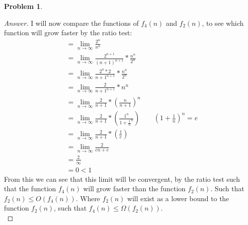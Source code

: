 \documentclass[11pt]{article}
\theoremstyle{definition}
\theoremstyle{definition}
\newtheorem{required}{Problem}
\theoremstyle{definition}
\begin{document}
\begin{required}
\begin{enumerate}[label=(\alph*)]
\begin{proof}[Answer]
I will now compare the functions of $f_4(n)$ and $f_2(n)$, to see which function will grow faster by the ratio test: \\
\begin{align*}
&= \lim_{n \to \infty} \frac{2^{n}}{n^{n}} \\
&= \lim_{n \to \infty} \frac{2^{n+1}}{(n+1)^{n+1}} * \frac{n^{n}}{2^{n}} \\
&= \lim_{n \to \infty} \frac{2^{n} * 2}{n+1^{n+1}} * \frac{n^{n}}{2^{n}} \\
&= \lim_{n \to \infty} \frac{2}{n+1^{n+1}} * n^{n} \\
&= \lim_{n \to \infty} \frac{2}{n+1} * (\frac{n}{n+1})^{n} \\
&= \lim_{n \to \infty} \frac{2}{n+1} * (\frac{1^{n}}{1+\frac{1}{n}^{n}}) \qquad (1+\frac{1}{n})^{n} = e \\
&= \lim_{n \to \infty} \frac{2}{n+1} * (\frac{1}{e}) \\
&= \lim_{n \to \infty} \frac{2}{en+e} \\
&= \frac{2}{\infty} \\
&= 0 < 1
\end{align*}
From this we can see that this limit will be convergent, by the ratio test such that the function $f_4(n)$ will grow faster than the function $f_2(n)$. Such that $f_2(n) \leq O(f_4(n))$. Where $f_2(n)$ will exist as a lower bound to the function $f_2(n)$, such that  $f_4(n) \leq \Omega(f_2(n))$. \\


\end{proof}
\end{enumerate}
\end{required}
\end{document}
